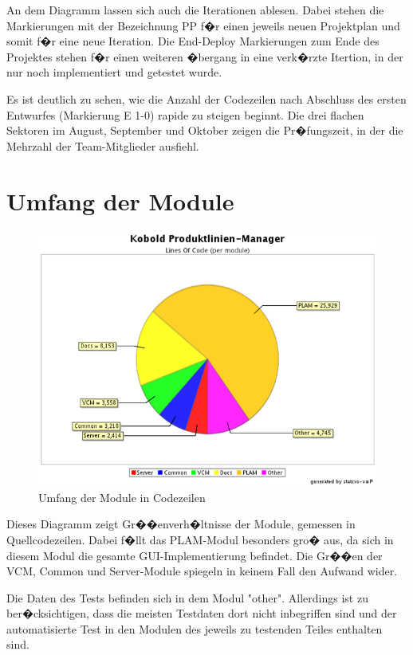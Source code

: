 \documentclass[a4paper,titlepage,12pt,ngerman]{scrbook}
\begin{document}
An dem Diagramm lassen sich auch die Iterationen ablesen. Dabei stehen die 
Markierungen mit der Bezeichnung PP f�r einen jeweils neuen Projektplan und
somit f�r eine neue Iteration. Die End-Deploy Markierungen zum Ende des Projektes
stehen f�r einen weiteren �bergang in eine verk�rzte Itertion, in der nur noch
implementiert und getestet wurde.\par

Es ist deutlich zu sehen, wie die Anzahl der Codezeilen nach Abschluss des ersten
Entwurfes (Markierung E 1-0) rapide zu steigen beginnt. Die drei flachen Sektoren im August, September und Oktober zeigen die
Pr�fungszeit, in der die Mehrzahl der Team-Mitglieder ausfiehl. 


\section{Umfang der Module}

\begin{figure}[h!]
  \centering
  \includegraphics[width=15cm]{praesentation/modulgroessen}
  \caption{Umfang der Module in Codezeilen}
\end{figure}

Dieses Diagramm zeigt Gr��enverh�ltnisse der Module, gemessen in
Quellcodezeilen. Dabei f�llt das PLAM-Modul besonders gro� aus, da sich
in diesem Modul die gesamte GUI-Implementierung befindet. Die Gr��en der
VCM, Common und Server-Module spiegeln in keinem Fall den Aufwand wider.\par

Die Daten des Tests befinden sich in dem Modul "other". Allerdings ist zu
ber�cksichtigen, dass die meisten Testdaten dort nicht inbegriffen sind und
der automatisierte Test in den Modulen des jeweils zu testenden Teiles enthalten
sind. 
\end{document}
